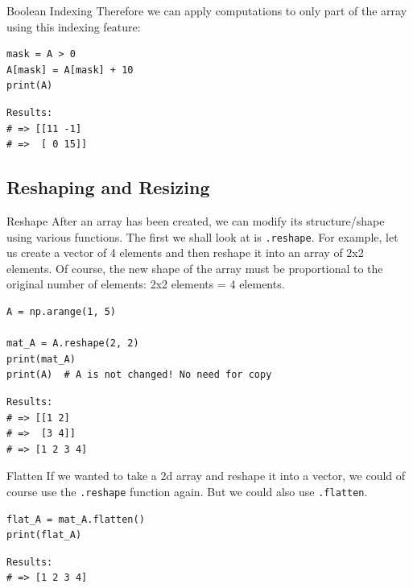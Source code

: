 \documentclass[10pt]{beamer}
\begin{document}
\begin{frame}[label={sec:orga9b8465},fragile]{Boolean Indexing}
 Therefore we can apply computations to only part of the array using this indexing
feature:

\begin{verbatim}
mask = A > 0
A[mask] = A[mask] + 10
print(A)
\end{verbatim}

\begin{verbatim}
Results: 
# => [[11 -1]
# =>  [ 0 15]]
\end{verbatim}
\end{frame}

\subsection{Reshaping and Resizing}
\label{sec:org7f188f6}

\begin{frame}[label={sec:org3c7e072},fragile]{Reshape}
 After an array has been created, we can modify its structure/shape using various
functions. The first we shall look at is \texttt{.reshape}. For example, let us create a
vector of 4 elements and then reshape it into an array of 2x2 elements. Of course,
the new shape of the array must be proportional to the original number of elements:
2x2 elements = 4 elements.

\begin{verbatim}
A = np.arange(1, 5)

mat_A = A.reshape(2, 2)
print(mat_A)
print(A)  # A is not changed! No need for copy
\end{verbatim}

\begin{verbatim}
Results: 
# => [[1 2]
# =>  [3 4]]
# => [1 2 3 4]
\end{verbatim}
\end{frame}

\begin{frame}[label={sec:orgfe5983d},fragile]{Flatten}
 If we wanted to take a 2d array and reshape it into a vector, we could of course use
the \texttt{.reshape} function again. But we could also use \texttt{.flatten}.

\begin{verbatim}
flat_A = mat_A.flatten()
print(flat_A)
\end{verbatim}

\begin{verbatim}
Results: 
# => [1 2 3 4]
\end{verbatim}
\end{frame}
\end{document}
